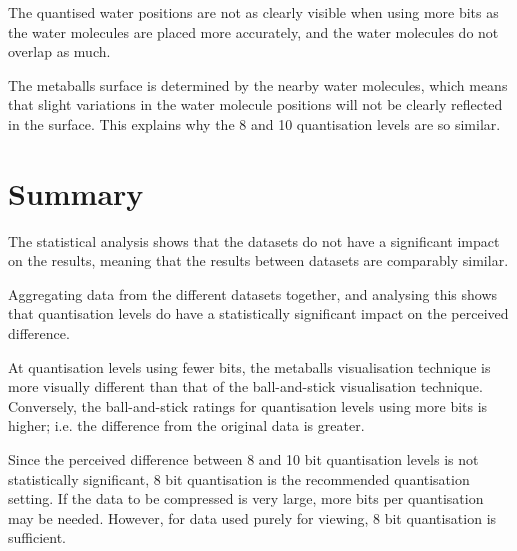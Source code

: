 The quantised water positions are not as clearly visible when using more bits
as the water molecules are placed more accurately, and the water molecules do
not overlap as much.

The metaballs surface is determined by the nearby water molecules, which means
that slight variations in the water molecule positions will not be clearly
reflected in the surface. This explains why the 8 and 10 quantisation levels
are so similar.



\section{Summary}
\label{sec:results_summary}

The statistical analysis shows that the datasets do not have a significant
impact on the results, meaning that the results between datasets are comparably
similar.

Aggregating data from the different datasets together, and analysing this shows
that quantisation levels do have a statistically significant impact on the
perceived difference.

At quantisation levels using fewer bits, the metaballs visualisation technique
is more visually different than that of the ball-and-stick visualisation
technique. Conversely, the ball-and-stick ratings for quantisation levels using
more bits is higher; i.e. the difference from the original data is greater.

Since the perceived difference between 8 and 10 bit quantisation levels is not
statistically significant, 8 bit quantisation is the recommended quantisation
setting. If the data to be compressed is very large, more bits per quantisation
may be needed. However, for data used purely for viewing, 8 bit quantisation is
sufficient.



